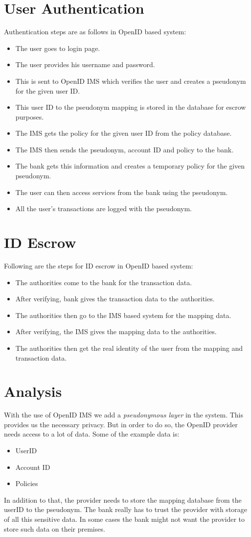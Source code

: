 \section{User Authentication}
Authentication steps are as follows in OpenID based system:
\begin{itemize}
	\item The user goes to login page.
	\item The user provides his username and password.
	\item This is sent to OpenID IMS which verifies the user and creates a pseudonym for the given user ID.
	\item This user ID to the pseudonym mapping is stored in the database for escrow purposes.
	\item The IMS gets the policy for the given user ID from the policy database.
	\item The IMS then sends the pseudonym, account ID and policy to the bank. 
	\item The bank gets this information and creates a temporary policy for the given pseudonym.
	\item The user can then access services from the bank using the pseudonym.
	\item All the user's transactions are logged with the pseudonym.
\end{itemize}
\section{ID Escrow}
Following are the steps for ID escrow in OpenID based system:
\begin{itemize}
	\item The authorities come to the bank for the transaction data.
	\item After verifying, bank gives the transaction data to the authorities.
	\item The authorities then go to the IMS based system for the mapping data.
	\item After verifying, the  IMS gives the mapping data to the authorities.
	\item The authorities then get the real identity of the user from the mapping and transaction data.
\end{itemize}
\section{Analysis}
With the use of OpenID IMS we add a \textit{pseudonymous layer} in the system. This provides us the necessary privacy. But in order to do so, the OpenID provider needs access to a lot of data. Some of the example data is:
\begin{itemize}
	\item UserID
	\item Account ID 
	\item Policies	
\end{itemize}
In addition to that, the provider needs to store the mapping database from the userID to the pseudonym. The bank really has to trust the provider with storage of all this sensitive data. In some cases the bank might not want the provider to store such data on their premises.

